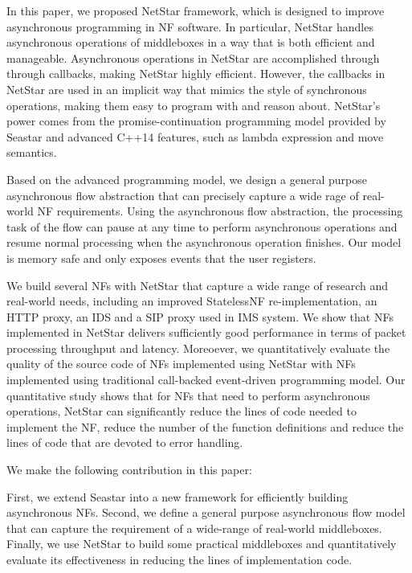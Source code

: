 In this paper, we proposed NetStar framework, which is designed to improve asynchronous programming in NF software. In particular, NetStar handles asynchronous operations of middleboxes in a way that is both efficient and manageable. Asynchronous operations in NetStar are accomplished through through callbacks, making NetStar highly efficient. However, the callbacks in NetStar are used in an implicit way that mimics the style of synchronous operations, making them easy to program with and reason about. NetStar's power comes from the promise-continuation programming model provided by Seastar \cite{seastar} and advanced C++14 features, such as lambda expression and move semantics.

Based on the advanced programming model, we design a general purpose asynchronous flow abstraction that can precisely capture a wide rage of real-world NF requirements. Using the asynchronous flow abstraction, the processing task of the flow can pause at any time to perform asynchronous operations and resume normal processing when the asynchronous operation finishes. Our model is memory safe and only exposes events that the user registers.

We build several NFs with NetStar that capture a wide range of research and real-world needs, including an improved StatelessNF re-implementation, an HTTP proxy, an IDS and a SIP proxy used in IMS system. We show that NFs implemented in NetStar delivers sufficiently good performance in terms of packet processing throughput and latency. Moreoever, we quantitatively evaluate the quality of the source code of NFs implemented using NetStar with NFs implemented using traditional call-backed event-driven programming model. Our quantitative study shows that for NFs that need to perform asynchronous operations, NetStar can significantly reduce the lines of code needed to implement the NF, reduce the number of the function definitions and reduce the lines of code that are devoted to error handling.

We make the following contribution in this paper:

First, we extend Seastar into a new framework for efficiently building asynchronous NFs. Second, we define a general purpose asynchronous flow model that can capture the requirement of a wide-range of real-world middleboxes. Finally, we use NetStar to build some practical middleboxes and quantitatively evaluate its effectiveness in reducing the lines of implementation code.
